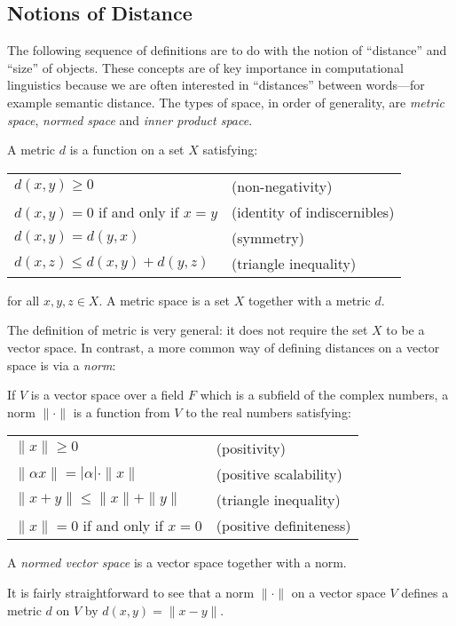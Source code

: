 \documentclass[12pt]{report}
\begin{document}
\subsection{Notions of Distance}

The following sequence of definitions are to do with the notion of ``distance'' and ``size'' of objects. These concepts are of key importance in computational linguistics because we are often interested in ``distances'' between words---for example semantic distance. The types of space, in order of generality, are \emph{metric space}, \emph{normed space} and \emph{inner product space}.
\begin{defn}[Metric]
A metric $d$ is a function on a set $X$ satisfying:
\begin{center}
\begin{tabular}{ll}
$d(x,y) \ge 0$ & (non-negativity)\\
$d(x,y) = 0$ if and only if $x=y$ & (identity of indiscernibles)\\
$d(x,y) = d(y,x)$ & (symmetry)\\
$d(x,z) \le d(x,y) + d(y,z)$ & (triangle inequality)
\end{tabular}
\end{center}
for all $x,y,z \in X$. A metric space is a set $X$ together with a metric $d$.
\end{defn}

The definition of metric is very general: it does not require the set $X$ to be a vector space. In contrast, a more common way of defining distances on a vector space is via a \emph{norm}:
\begin{defn}[Norm]
If $V$ is a vector space over a field $F$ which is a subfield of the complex numbers, a norm $\|\cdot\|$ is a function from $V$ to the real numbers satisfying:
\begin{center}
\begin{tabular}{ll}
$\|x\| \ge 0$ & (positivity)\\
$\|\alpha x\| = |\alpha|\cdot\|x\|$ & (positive scalability)\\
$\|x + y\| \le \|x\| + \|y\|$ & (triangle inequality)\\
$\|x\| = 0$ if and only if $x = 0$ & (positive definiteness)
\end{tabular}
\end{center}
A \emph{normed vector space} is a vector space together with a norm.
\end{defn}
It is fairly straightforward to see that a norm $\|\cdot\|$ on a vector space $V$ defines a metric $d$ on $V$ by $d(x,y) = \|x - y\|$.
\end{document}
